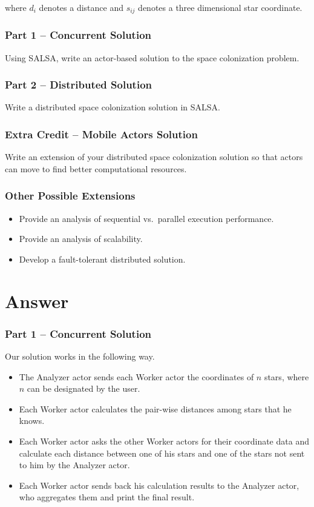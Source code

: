 \documentclass[12pt,letterpaper]{article}
\begin{document}
where $d_i$ denotes a distance and $s_{ij}$ denotes a three dimensional star coordinate. 

\section*{Part 1 -- Concurrent Solution}
Using SALSA, write an actor-based solution to the space colonization problem.

\section*{Part 2 -- Distributed Solution}
Write a distributed space colonization solution in SALSA.

\section*{Extra Credit -- Mobile Actors Solution}
Write an extension of your distributed space colonization solution so that actors can move to find better computational resources. 

\section*{Other Possible Extensions}
\begin{itemize}
\item Provide an analysis of sequential vs.~parallel execution performance.
\item Provide an analysis of scalability.
\item Develop a fault-tolerant distributed solution.
\end{itemize}

\part*{Answer}
\section*{Part 1 -- Concurrent Solution}
Our solution works in the following way. 
\begin{itemize}
\item The Analyzer actor sends each Worker actor the coordinates of $n$ stars, where $n$ can be designated by the user. 
\item Each Worker actor calculates the pair-wise distances among stars that he knows.
\item Each Worker actor asks the other Worker actors for their coordinate data and calculate each distance between one of his stars and one of the stars not sent to him by the Analyzer actor.
\item Each Worker actor sends back his calculation results to the Analyzer actor, who aggregates them and print the final result.
\end{itemize}
\end{document}
